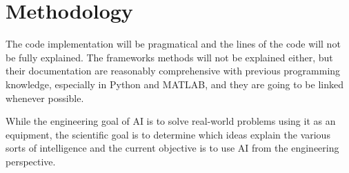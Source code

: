 \chapter{Methodology}\label{sec:methodology}

The code implementation will be pragmatical and the lines of the code will not be fully explained. The frameworks methods will not be explained either, but their documentation are reasonably comprehensive with previous programming knowledge, especially in Python and MATLAB, and they are going to be linked whenever possible.

While the engineering goal of AI is to solve real-world problems using it as an equipment, the scientific goal is to determine which ideas explain the various sorts of intelligence \cite{winston1992} and the current objective is to use AI from the engineering perspective.
